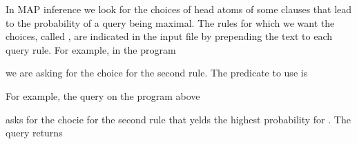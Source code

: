 \documentclass[letterpaper,10pt,english]{sphinxmanual}
\begin{document}
\sphinxAtStartPar
In MAP inference we look for the choices of head atoms of some clauses that lead to the probability of a query being
maximal. The rules for which we want the choices, called , are indicated in the input file by prepending
the text  to each query rule. For example, in the program 

\begin{sphinxVerbatim}[commandchars=\\\{\}]
    
  

  
\end{sphinxVerbatim}

\sphinxAtStartPar
we are asking for the choice for the second rule.
The predicate to use is

\begin{sphinxVerbatim}[commandchars=\\\{\}]
  
\end{sphinxVerbatim}

\sphinxAtStartPar
For example, the query on the program above

\begin{sphinxVerbatim}[commandchars=\\\{\}]
 
\end{sphinxVerbatim}

\sphinxAtStartPar
asks for the chocie for the second rule that yelds the highest probability for . The query returns
\end{document}
